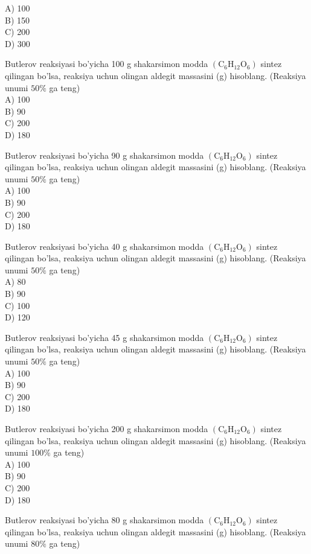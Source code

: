 A) 100\\
B) 150\\
C) 200\\
D) 300
  \item Butlerov reaksiyasi bo'yicha 100 g shakarsimon modda $\left(\mathrm{C}_{6} \mathrm{H}_{12} \mathrm{O}_{6}\right)$ sintez qilingan bo'lsa, reaksiya uchun olingan aldegit massasini (g) hisoblang. (Reaksiya unumi $50 \%$ ga teng)\\
A) 100\\
B) 90\\
C) 200\\
D) 180
  \item Butlerov reaksiyasi bo'yicha 90 g shakarsimon modda $\left(\mathrm{C}_{6} \mathrm{H}_{12} \mathrm{O}_{6}\right)$ sintez qilingan bo'lsa, reaksiya uchun olingan aldegit massasini (g) hisoblang. (Reaksiya unumi $50 \%$ ga teng)\\
A) 100\\
B) 90\\
C) 200\\
D) 180
  \item Butlerov reaksiyasi bo'yicha 40 g shakarsimon modda $\left(\mathrm{C}_{6} \mathrm{H}_{12} \mathrm{O}_{6}\right)$ sintez qilingan bo'lsa, reaksiya uchun olingan aldegit massasini (g) hisoblang. (Reaksiya unumi $50 \%$ ga teng)\\
A) 80\\
B) 90\\
C) 100\\
D) 120
  \item Butlerov reaksiyasi bo'yicha 45 g shakarsimon modda $\left(\mathrm{C}_{6} \mathrm{H}_{12} \mathrm{O}_{6}\right)$ sintez qilingan bo'lsa, reaksiya uchun olingan aldegit massasini (g) hisoblang. (Reaksiya unumi $50 \%$ ga teng)\\
A) 100\\
B) 90\\
C) 200\\
D) 180
  \item Butlerov reaksiyasi bo'yicha 200 g shakarsimon modda $\left(\mathrm{C}_{6} \mathrm{H}_{12} \mathrm{O}_{6}\right)$ sintez qilingan bo'lsa, reaksiya uchun olingan aldegit massasini (g) hisoblang. (Reaksiya unumi $100 \%$ ga teng)\\
A) 100\\
B) 90\\
C) 200\\
D) 180
  \item Butlerov reaksiyasi bo'yicha 80 g shakarsimon modda $\left(\mathrm{C}_{6} \mathrm{H}_{12} \mathrm{O}_{6}\right)$ sintez qilingan bo'lsa, reaksiya uchun olingan aldegit massasini (g) hisoblang. (Reaksiya unumi $80 \%$ ga teng)\\
